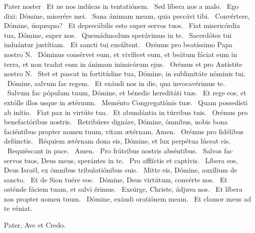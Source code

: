 Pater noster  \V\ Et ne nos indúcas in tentatiónem. \R\ Sed líbera nos a malo. \V\ Ego dixi: Dómine, miserére mei. \R\ Sana ánimam meam, quia peccávi tibi. \V\ Convértere, Dómine, úsquequo? \R\ Et deprecábilis esto super servos tuos. \V\ Fiat misericórdia tua, Dómine, super nos. \R\ Quemádmodum sperávimus in te. \V\ Sacerdótes tui induántur justítiam. \R\ Et sancti tui exsúltent. \V\ Orémus pro beatíssimo Papa nostro N. \R\ Dóminus consérvet eum, et vivíficet eum, et beátum fáciat eum in terra, et non tradat eum in ánimam inimicórum ejus. \V\ Orémus et pro Antístite nostro N. \R\ Stet et pascat in fortitúdine tua, Dómine, in sublimitáte nóminis tui. \V\ Dómine, salvum fac regem. \R\ Et exáudi nos in die, qua invocavérimus te. \V\ Salvum fac pópulum tuum, Dómine, et bénedic hereditáti tuæ. \R\ Et rege eos, et extólle illos usque in ætérnum. \V\ Meménto Congregatiónis tuæ. \R\ Quam possedísti ab inítio. \V\ Fiat pax in virtúte tua. \R\ Et abundántia in túrribus tuis. \V\ Orémus pro benefactóribus nostris. \R\ Retribúere dignáre, Dómine, ómnibus, nobis bona faciéntibus propter nomen tuum, vitam ætérnam. Amen. \V\ Orémus pro fidélibus defúnctis. \R\ Réquiem ætérnam dona eis, Dómine, et lux perpétua lúceat eis. \V\ Requiéscant in pace. \R\ Amen. \V\ Pro frátribus nostris abséntibus. \R\ Salvos fac servos tuos, Deus meus, sperántes in te. \V\ Pro afflíctis et captívis. \R\ Líbera eos, Deus Israël, ex ómnibus tribulatiónibus suis. \V\ Mitte eis, Dómine, auxílium de sancto. \R\ Et de Sion tuére eos. \V\ Dómine, Deus virtútum, convérte nos. \R\ Et osténde fáciem tuam, et salvi érimus. \V\ Exsúrge, Christe, ádjuva nos. \R\ Et líbera nos propter nomen tuum. \V\ Dómine, exáudi oratiónem meam. \R\ Et clamor meus ad te véniat.



Pater, Ave et Credo.

